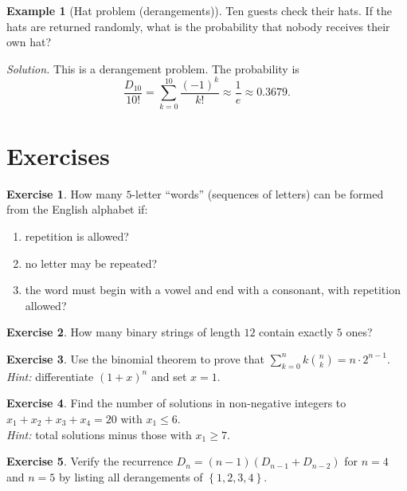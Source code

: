 \documentclass[12pt,a4paper,openany]{book}
\theoremstyle{definition}
\newtheorem{example}[definition]{Example}
\newtheorem{exercise}{Exercise}[chapter]
\theoremstyle{plain}
\theoremstyle{remark}
\newcommand{\set}[1]{\left\{#1\right\}}
\begin{document}
\begin{example}[Hat problem (derangements)]\label{ex:hat-problem}
Ten guests check their hats. If the hats are returned randomly, what is the
probability that nobody receives their own hat?

\emph{Solution.}\; This is a derangement problem. The probability is
\[
  \frac{D_{10}}{10!} = \sum_{k=0}^{10}\frac{(-1)^k}{k!}
  \approx \frac{1}{e} \approx 0.3679.
\]
\end{example}

\section{Exercises}
\label{sec:ch4-exercises}

\begin{exercise}\label{exer:counting-words}
How many $5$-letter ``words'' (sequences of letters) can be formed from the
English alphabet if:
\begin{enumerate}[label=(\alph*)]
  \item repetition is allowed?
  \item no letter may be repeated?
  \item the word must begin with a vowel and end with a consonant, with
        repetition allowed?
\end{enumerate}
\end{exercise}

\begin{exercise}\label{exer:binary-strings}
How many binary strings of length $12$ contain exactly $5$ ones?
\end{exercise}

\begin{exercise}\label{exer:binomial-identity}
Use the binomial theorem to prove that
$\displaystyle\sum_{k=0}^{n} k\binom{n}{k} = n \cdot 2^{n-1}$.\\
\emph{Hint:} differentiate $(1 + x)^n$ and set $x = 1$.
\end{exercise}

\begin{exercise}\label{exer:stars-bars-upper}
Find the number of solutions in non-negative integers to
$x_1 + x_2 + x_3 + x_4 = 20$ with $x_1 \leq 6$.\\
\emph{Hint:} total solutions minus those with $x_1 \geq 7$.
\end{exercise}

\begin{exercise}\label{exer:derangement-formula-check}
Verify the recurrence $D_n = (n-1)(D_{n-1} + D_{n-2})$ for $n = 4$ and
$n = 5$ by listing all derangements of $\set{1,2,3,4}$.
\end{exercise}
\end{document}
